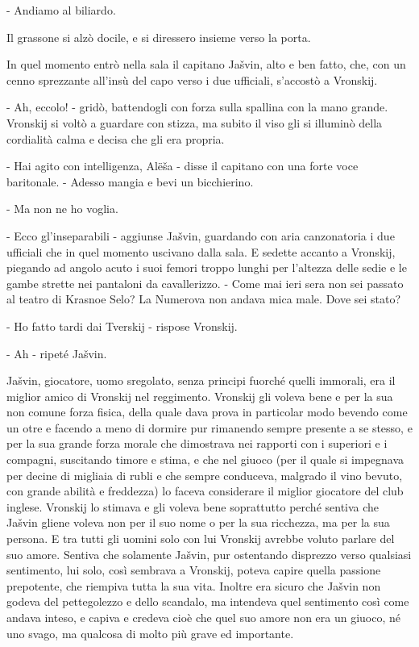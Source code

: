 - Andiamo al biliardo. 

Il grassone si alzò docile, e si diressero insieme verso la porta. 

In quel momento entrò nella sala il capitano Jašvin, alto e ben fatto, che, con un cenno sprezzante all'insù del capo verso i due ufficiali, s'accostò a Vronskij. 

- Ah, eccolo! - gridò, battendogli con forza sulla spallina con la mano grande. Vronskij si voltò a guardare con stizza, ma subito il viso gli si illuminò della cordialità calma e decisa che gli era propria. 

- Hai agito con intelligenza, Alëša - disse il capitano con una forte voce baritonale. - Adesso mangia e bevi un bicchierino. 

- Ma non ne ho voglia. 

- Ecco gl'inseparabili - aggiunse Jašvin, guardando con aria canzonatoria i due ufficiali che in quel momento uscivano dalla sala. E sedette accanto a Vronskij, piegando ad angolo acuto i suoi femori troppo lunghi per l'altezza delle sedie e le gambe strette nei pantaloni da cavallerizzo. - Come mai ieri sera non sei passato al teatro di Krasnoe Selo? La Numerova non andava mica male. Dove sei stato? 

- Ho fatto tardi dai Tverskij - rispose Vronskij. 

- Ah - ripeté Jašvin. 

Jašvin, giocatore, uomo sregolato, senza principi fuorché quelli immorali, era il miglior amico di Vronskij nel reggimento. Vronskij gli voleva bene e per la sua non comune forza fisica, della quale dava prova in particolar modo bevendo come un otre e facendo a meno di dormire pur rimanendo sempre presente a se stesso, e per la sua grande forza morale che dimostrava nei rapporti con i superiori e i compagni, suscitando timore e stima, e che nel giuoco (per il quale si impegnava per decine di migliaia di rubli e che sempre conduceva, malgrado il vino bevuto, con grande abilità e freddezza) lo faceva considerare il miglior giocatore del club inglese. Vronskij lo stimava e gli voleva bene soprattutto perché sentiva che Jašvin gliene voleva non per il suo nome o per la sua ricchezza, ma per la sua persona. E tra tutti gli uomini solo con lui Vronskij avrebbe voluto parlare del suo amore. Sentiva che solamente Jašvin, pur ostentando disprezzo verso qualsiasi sentimento, lui solo, così sembrava a Vronskij, poteva capire quella passione prepotente, che riempiva tutta la sua vita. Inoltre era sicuro che Jašvin non godeva del pettegolezzo e dello scandalo, ma intendeva quel sentimento così come andava inteso, e capiva e credeva cioè che quel suo amore non era un giuoco, né uno svago, ma qualcosa di molto più grave ed importante. 

